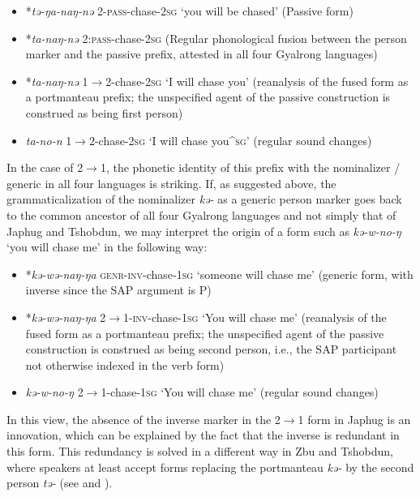 \documentclass[oneside,a4paper,11pt]{article}
\newcommand{\ipa}[1]{\textit{\phon\mbox{#1}}} %
\begin{document}
\begin{itemize}
\item *\ipa{tə-ŋa-naŋ-nə}  2-\textsc{pass}-chase-\textsc{2sg} `you will be chased' (Passive form)
\item *\ipa{ta-naŋ-nə}  2:\textsc{pass}-chase-\textsc{2sg} (Regular phonological fusion between the person marker and the passive prefix, attested in all four Gyalrong languages)  
\item  *\ipa{ta-naŋ-nə}  1$\rightarrow$2-chase-\textsc{2sg} `I will chase you' (reanalysis of the fused form as a portmanteau prefix; the unspecified agent of the passive construction is construed as being first person)
\item  \ipa{ta-no-n} 1$\rightarrow$2-chase-\textsc{2sg} `I will chase you^{\textsc{sg}}' (regular sound changes)
\end{itemize}


In the case of 2$\rightarrow$1, the phonetic identity of this prefix with the nominalizer / generic in all four languages is striking. If, as suggested above, the grammaticalization of the nominalizer \ipa{kə-} as a generic person marker goes back to the common ancestor of all four Gyalrong languages and not simply that of Japhug and Tshobdun, we may interpret the origin of a form such as \ipa{kə-w-no-ŋ} `you will chase me' in the following way:


\begin{itemize}
\item *\ipa{kə-wə-naŋ-ŋa}  \textsc{genr}-\textsc{inv}-chase-\textsc{1sg} `someone will chase me' (generic form, with inverse since the SAP argument is P)
\item  *\ipa{kə-wə-naŋ-ŋa}  2$\rightarrow$1-\textsc{inv}-chase-\textsc{1sg} `You will chase me' (reanalysis of the fused form as a portmanteau prefix; the unspecified agent of the passive construction is construed as being second person, i.e., the SAP participant not otherwise indexed in the verb form)
\item  \ipa{kə-w-no-ŋ} 2$\rightarrow$1-chase-\textsc{1sg} `You will chase me'  (regular sound changes)
\end{itemize}

In this view, the absence of the inverse marker in the  2$\rightarrow$1 form in Japhug is an innovation, which can be explained by the fact that the inverse is redundant in this form. This redundancy is solved in a different way in Zbu and Tshobdun, where speakers at least accept forms replacing the portmanteau \ipa{kə-} by the second person \ipa{tə-} (see \citealt{jackson02rentongdengdi} and \citealt{gongxun14agreement}).
 
\end{document}
